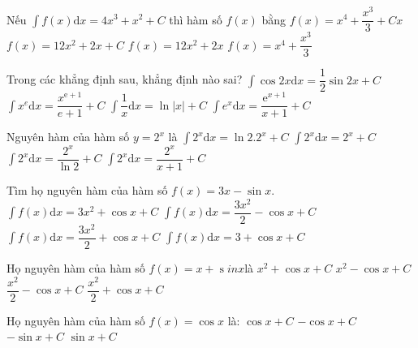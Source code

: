 \begin{ex}
	Nếu $\displaystyle\int{f(x)\mathrm{d}x=4x^3+x^2+C}$ thì hàm số $ f(x)$ bằng
	\choice
	{$ f(x)=x^4+\dfrac{x^3}{3}+Cx$}
	{$ f(x)=12x^2+2x+C$}
	{\True $ f(x)=12x^2+2x$}
	{$ f(x)=x^4+\dfrac{x^3}{3}$}
\end{ex}
\begin{ex}
	Trong các khẳng định sau, khẳng định nào sai?
	\choice
	{$\displaystyle\int{\cos 2x\mathrm{d}x=\dfrac{1}{2}\sin 2x+C}$}
	{$\displaystyle\int{x^{{e}}}\mathrm{d}x=\dfrac{x^{{\mathrm{e}}+1}}{{e}+1}+C$}
	{$\displaystyle\int{\dfrac{1}{x}\mathrm{d}x=\ln \left| x\right|}+C$}
	{\True $\displaystyle\int{{e}^x\mathrm{d}x=\dfrac{{\mathrm{e}}^{x+1}}{x+1}+C}$}
\end{ex}
\begin{ex}
	Nguyên hàm của hàm số $y=2^x$ là
	\choice
	{$\displaystyle\int{2^x\mathrm{d}x=\ln {2.2^x}+C}$}
	{$\displaystyle\int{2^x\mathrm{d}x=2^x+C}$}
	{\True $\displaystyle\int{2^x\mathrm{d}x=\dfrac{2^x}{\ln 2}+C}$}
	{$\displaystyle\int{2^x\mathrm{d}x=\dfrac{2^x}{x+1}+C}$}
\end{ex}
\begin{ex}
	Tìm họ nguyên hàm của hàm số $ f(x)=3x-\sin x$.
	\choice
	{$\displaystyle\int{f(x)}\mathrm{d}x=3x^2+\cos x+C$}
	{$\displaystyle\int{f(x)}\mathrm{d}x=\dfrac{3x^2}{2}-\cos x+C$}
	{\True $\displaystyle\int{f(x)}\mathrm{d}x=\dfrac{3x^2}{2}+\cos x+C$}
	{$\displaystyle\int{f(x)}\mathrm{d}x=3+\cos x+C$}
\end{ex}
\begin{ex}
	Họ nguyên hàm của hàm số $ f(x)=x+\operatorname{s}{inx}$là
	\choice
	{$x^2+\cos{x+C}$}
	{$x^2-\cos{x+C}$}
	{\True $\dfrac{x^2}{2}-\cos{x+C}$}
	{$\dfrac{x^2}{2}+\cos{x+C}$}
\end{ex}
\begin{ex}
	Họ nguyên hàm của hàm số $ f(x)=\cos x$ là:
	\choice
	{$\cos x+C$}
	{$-\cos x+C$}
	{$-\sin x+C$}
	{\True $\sin x+C$}
\end{ex}
